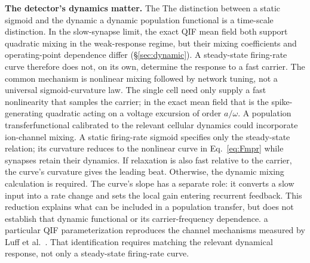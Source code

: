 \documentclass[11pt,a4paper]{article}
\providecommand{\DIFaddtex}[1]{{\protect\color{blue} \sf #1}} %
\providecommand{\DIFdeltex}[1]{{\protect\color{red} \scriptsize #1}} %
\providecommand{\DIFaddbegin}{} %
\providecommand{\DIFaddend}{} %
\providecommand{\DIFdelbegin}{} %
\providecommand{\DIFdelend}{} %
\providecommand{\DIFadd}[1]{\texorpdfstring{\DIFaddtex{#1}}{#1}} %
\providecommand{\DIFdel}[1]{\texorpdfstring{\DIFdeltex{#1}}{}} %
\begin{document}
\DIFdelbegin \DIFdel{\textbf{The detector's dynamics matter.} The }\DIFdelend \DIFaddbegin \DIFadd{The distinction between a }\DIFaddend static sigmoid and \DIFdelbegin \DIFdel{the dynamic }\DIFdelend \DIFaddbegin \DIFadd{a dynamic population functional is a
time-scale distinction. In the slow-synapse limit, the exact }\DIFaddend QIF mean field \DIFdelbegin \DIFdel{both support quadratic mixing in the weak-response regime, but their mixing coefficients
and operating-point dependence differ (\S\ref{sec:dynamic}).
A steady-state firing-rate
curve therefore does not, on its own, determine the response to a fast carrier. The common
mechanism is nonlinear mixing followed by network tuning, not a universal
sigmoid-curvature law. The
single cell need only supply a fast nonlinearity that samples
the carrier; in the exact mean field that is the spike-generating quadratic acting on a voltage excursion of order $a/\omega$.
A population transferfunctional calibrated to the relevant cellular dynamics could
incorporate ion-channel mixing. A static firing-rate sigmoid specifies only the
steady-state relation; its curvature }\DIFdelend \DIFaddbegin \DIFadd{reduces
to the nonlinear curve in Eq.~\eqref{eq:Fmpr} while synapses retain their dynamics.
If relaxation is also fast relative to the carrier, the curve's curvature gives
the leading beat. Otherwise, the dynamic mixing calculation is required. The
curve's slope has a separate role: it converts a slow input into a rate change and
sets the local gain entering recurrent feedback. This reduction explains what
can be included in a population transfer, but }\DIFaddend does not establish that \DIFdelbegin \DIFdel{dynamic functional or its
carrier-frequency dependence.}\DIFdelend \DIFaddbegin \DIFadd{a particular
QIF parameterization reproduces the channel mechanisms measured by Luff et al.\
\cite{luff2024mixer}. That identification requires matching the relevant dynamical
response, not only a steady-state firing-rate curve.
}\DIFaddend
\end{document}
